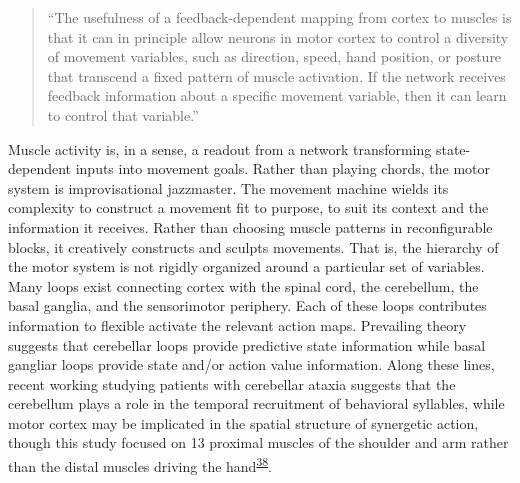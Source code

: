 \documentclass[
  a4paper,
]{article}
\begin{document}
\begin{quote}
``The usefulness of a feedback-dependent mapping from cortex to muscles
is that it can in principle allow neurons in motor cortex to control a
diversity of movement variables, such as direction, speed, hand
position, or posture that transcend a fixed pattern of muscle
activation. If the network receives feedback information about a
specific movement variable, then it can learn to control that
variable.''
\end{quote}

Muscle activity is, in a sense, a readout from a network transforming
state-dependent inputs into movement goals. Rather than playing chords,
the motor system is improvisational jazzmaster. The movement machine
wields its complexity to construct a movement fit to purpose, to suit
its context and the information it receives. Rather than choosing muscle
patterns in reconfigurable blocks, it creatively constructs and sculpts
movements. That is, the hierarchy of the motor system is not rigidly
organized around a particular set of variables. Many loops exist
connecting cortex with the spinal cord, the cerebellum, the basal
ganglia, and the sensorimotor periphery. Each of these loops contributes
information to flexible activate the relevant action maps. Prevailing
theory suggests that cerebellar loops provide predictive state
information while basal gangliar loops provide state and/or action value
information. Along these lines, recent working studying patients with
cerebellar ataxia suggests that the cerebellum plays a role in the
temporal recruitment of behavioral syllables, while motor cortex may be
implicated in the spatial structure of synergetic action, though this
study focused on 13 proximal muscles of the shoulder and arm rather than
the distal muscles driving the
hand\textsuperscript{\protect\hyperlink{ref-bergerDoesCerebellumShape2020}{38}}.
\end{document}
